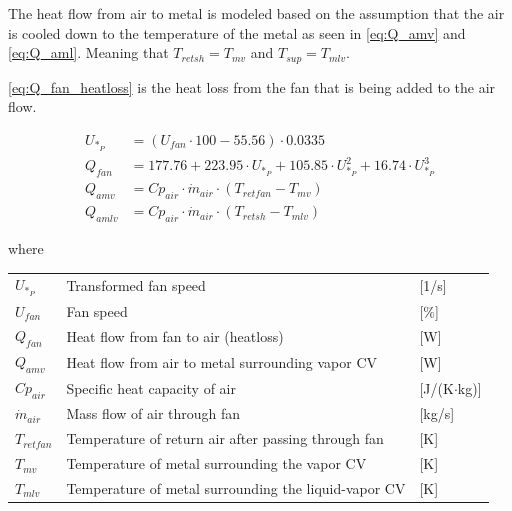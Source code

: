 \medskip
The heat flow from air to metal is modeled based on the assumption that the air is cooled down to the temperature of the metal as seen in \cref{eq:Q_amv} and \cref{eq:Q_aml}. Meaning that $T_{retsh} = T_{mv}$ and $T_{sup} = T_{mlv}$.

\cref{eq:Q_fan_heatloss} is the heat loss from the fan that is being added to the air flow. 

\begin{align}
	U_{*_P} & = \left( U_{fan}\cdot 100 - 55.56 \right) \cdot 0.0335                                         \\
	Q_{fan} & = 177.76 + 223.95 \cdot U_{*_P} + 105.85 \cdot U_{*_P}^2 + 16.74 \cdot U_{*_P}^3	\label{eq:Q_fan_heatloss} \\
	Q_{amv} & = Cp_{air} \cdot \dot{m}_{air} \cdot (T_{retfan} - T_{mv}) 	\label{eq:Q_amv}                                \\
	Q_{amlv} & = Cp_{air} \cdot \dot{m}_{air} \cdot (T_{retsh} - T_{mlv}) 	\label{eq:Q_aml}
\end{align}

where

\begin{center}
	\begin{tabular}{l p{10cm} l}
		$U_{*_P}$       & Transformed fan speed                                & [1/\si{s}]                        \\
		$U_{fan}$       & Fan speed                                            & [$\%$]                        \\
		$Q_{fan}$       & Heat flow from fan to air (heatloss)                 & [\si{W}]                          \\
		$Q_{amv}$       & Heat flow from air to metal surrounding vapor CV     & [\si{W}]                          \\
		$Cp_{air}$      & Specific heat capacity of air                        & [\si{J}/(\si{K}$ \cdot $\si{kg})] \\
		$\dot{m}_{air}$ & Mass flow of air through fan                         & [\si{kg}/\si{s}]                  \\
		$T_{retfan}$    & Temperature of return air after passing through fan  & [\si{K}]                          \\
		$T_{mv}$        & Temperature of metal surrounding the vapor CV        & [\si{K}]                          \\
		$T_{mlv}$       & Temperature of metal surrounding the liquid-vapor CV & [\si{K}]
	\end{tabular}
\end{center}


